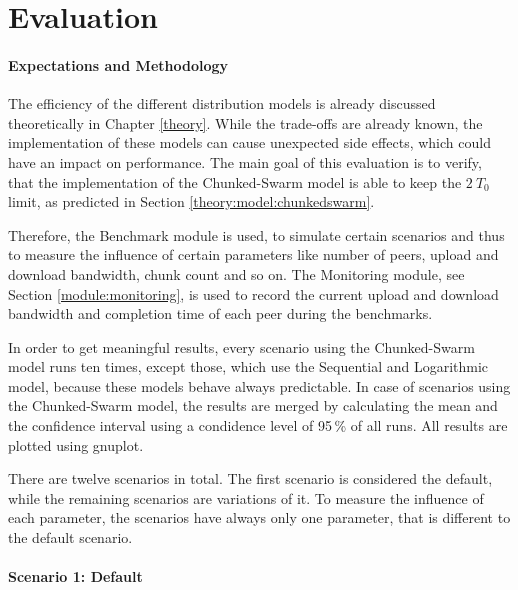 
\chapter{Evaluation}
\label{evaluation}

\subsubsection{Expectations and Methodology}

The efficiency of the different distribution models is already discussed theoretically in Chapter \ref{theory}. While the trade-offs are already known, the implementation of these models can cause unexpected side effects, which could have an impact on performance. The main goal of this evaluation is to verify, that the implementation of the Chunked-Swarm model is able to keep the $2\:T_0$ limit, as predicted in Section \ref{theory:model:chunkedswarm}.

Therefore, the Benchmark module is used, to simulate certain scenarios and thus to measure the influence of certain parameters like number of peers, upload and download bandwidth, chunk count and so on. The Monitoring module, see Section \ref{module:monitoring}, is used to record the current upload and download bandwidth and completion time of each peer during the benchmarks.

In order to get meaningful results, every scenario using the Chunked-Swarm model runs ten times, except those, which use the Sequential and Logarithmic model, because these models behave always predictable. In case of scenarios using the Chunked-Swarm model, the results are merged by calculating the mean and the confidence interval using a condidence level of 95\,\% of all runs. All results are plotted using gnuplot.

There are twelve scenarios in total. The first scenario is considered the default, while the remaining scenarios are variations of it. To measure the influence of each parameter, the scenarios have always only one parameter, that is different to the default scenario.

\subsubsection{Scenario 1: Default}

